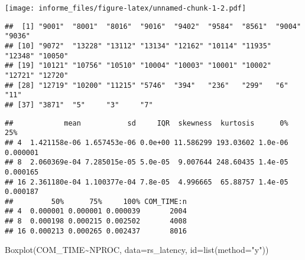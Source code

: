 \documentclass[
]{article}
\newenvironment{Shaded}{\begin{snugshade}}{\end{snugshade}}
\newcommand{\AttributeTok}[1]{\textcolor[rgb]{0.77,0.63,0.00}{#1}}
\newcommand{\ConstantTok}[1]{\textcolor[rgb]{0.00,0.00,0.00}{#1}}
\newcommand{\DecValTok}[1]{\textcolor[rgb]{0.00,0.00,0.81}{#1}}
\newcommand{\FunctionTok}[1]{\textcolor[rgb]{0.00,0.00,0.00}{#1}}
\newcommand{\NormalTok}[1]{#1}
\newcommand{\OtherTok}[1]{\textcolor[rgb]{0.56,0.35,0.01}{#1}}
\newcommand{\SpecialCharTok}[1]{\textcolor[rgb]{0.00,0.00,0.00}{#1}}
\newcommand{\StringTok}[1]{\textcolor[rgb]{0.31,0.60,0.02}{#1}}
\begin{document}
\texttt{[image: informe\_files/figure-latex/unnamed-chunk-1-2.pdf]}

\begin{verbatim}
##  [1] "9001"  "8001"  "8016"  "9016"  "9402"  "9584"  "8561"  "9004"  "9036" 
## [10] "9072"  "13228" "13112" "13134" "12162" "10114" "11935" "12348" "10050"
## [19] "10121" "10756" "10510" "10004" "10003" "10001" "10002" "12721" "12720"
## [28] "12719" "10200" "11215" "5746"  "394"   "236"   "299"   "6"     "11"   
## [37] "3871"  "5"     "3"     "7"
\end{verbatim}

\begin{Shaded}
\end{Shaded}

\begin{verbatim}
##            mean           sd     IQR  skewness  kurtosis      0%      25%
## 4  1.421158e-06 1.657453e-06 0.0e+00 11.586299 193.03602 1.0e-06 0.000001
## 8  2.060369e-04 7.285015e-05 5.0e-05  9.007644 248.60435 1.4e-05 0.000165
## 16 2.361180e-04 1.100377e-04 7.8e-05  4.996665  65.88757 1.4e-05 0.000187
##         50%      75%     100% COM_TIME:n
## 4  0.000001 0.000001 0.000039       2004
## 8  0.000198 0.000215 0.002502       4008
## 16 0.000213 0.000265 0.002437       8016
\end{verbatim}

\begin{Shaded}
\begin{Highlighting}[]
\FunctionTok{Boxplot}\NormalTok{(COM\_TIME}\SpecialCharTok{\textasciitilde{}}\NormalTok{NPROC, }\AttributeTok{data=}\NormalTok{rs\_latency, }\AttributeTok{id=}\FunctionTok{list}\NormalTok{(}\AttributeTok{method=}\StringTok{"y"}\NormalTok{))}
\end{Highlighting}
\end{Shaded}
\end{document}
